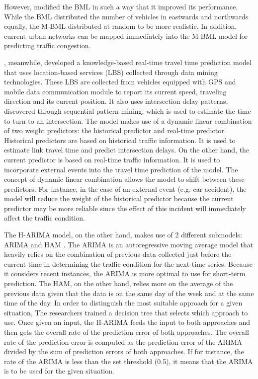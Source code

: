 However,  modified the BML in such a way that it improved its performance. While the BML distributed the number of vehicles in eastwards and northwards equally, the M-BML distributed at random to be more realistic. In addition, current urban networks can be mapped immediately into the M-BML model for predicting traffic congestion.

, meanwhile, developed a knowledge-based real-time travel time prediction model that uses location-based services (LBS) collected through data mining technologies. These LBS are collected from vehicles equipped with GPS and mobile data communication module to report its current speed, traveling direction and its current position. It also uses intersection delay patterns, discovered through sequential pattern mining, which is used to estimate the time to turn to an intersection. The model makes use of a dynamic linear combination of two weight predictors: the historical predictor and real-time predictor. Historical predictors are based on historical traffic information. It is used to estimate link travel time and predict intersection delays. On the other hand, the current predictor is based on real-time traffic information. It is used to incorporate external events into the travel time prediction of the model. The concept of dynamic linear combination allows the model to shift between these predictors. For instance, in the case of an external event (e.g. car accident), the model will reduce the weight of the historical predictor because the current predictor may be more reliable since the effect of this incident will immediately affect the traffic condition.

The H-ARIMA model, on the other hand, makes use of 2 different submodels: ARIMA and HAM . The ARIMA is an autoregressive moving average model that heavily relies on the combination of previous data collected just before the current time in determining the traffic condition for the next time series. Because it considers recent instances, the ARIMA is more optimal to use for short-term prediction. The HAM, on the other hand, relies more on the average of the previous data given that the data is on the same day of the week and at the same time of the day. In order to distinguish the most suitable approach for a given situation, The researchers trained a decision tree that selects which approach to use. Once given an input, the H-ARIMA feeds the input to both approaches and then gets the overall rate of the prediction error of both approaches. The overall rate of the prediction error is computed as the prediction error of the ARIMA divided by the sum of prediction errors of both approaches. If for instance, the rate of the ARIMA is less than the set threshold (0.5), it means that the ARIMA is to be used for the given situation.

